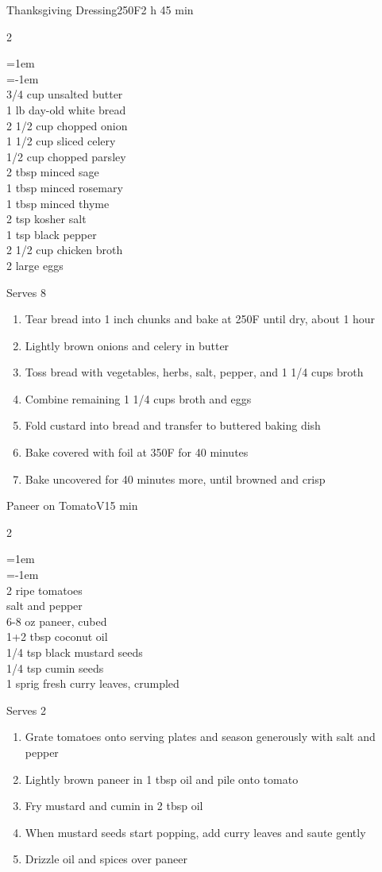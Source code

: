 \documentclass{article}
\newenvironment{recipe}[3][]
    {\begin{cardbase}[#1]{#2}{#3}
    \columnratio{0.333}
    \begin{paracol}{2}}
    {\end{paracol}\end{cardbase}}
\newenvironment{denserecipe}[3][]
    {\small
    \begin{recipe}[#1]{#2}{#3}}
    {\end{recipe}}
\newcommand{\nextcolumn}{\switchcolumn}
\newenvironment{ingredients}
    {
    \begin{obeylines}
    \vspace{\parskip}
    \setlength{\parskip}{0.25em}
    \vspace{-0.25em}
    \leftskip=1em
    \parindent=-1em}
    {\end{obeylines}}
\newenvironment{steps}
    {\begin{enumerate}[leftmargin=*,topsep=0pt]}
    {\end{enumerate}}
\newcommand{\fahrenheit}[1]{#1\textdegree{}F}
\newcommand{\tag}[1]{\hspace{1em}#1}
\newcommand{\symboltag}[2]{\tag{#1\hspace{0.4em}#2}}
\newcommand{\totaltime}[1]{\symboltag{\raisebox{-0.1em}{\small\StopWatchEnd}}{#1}}
\newcommand{\preheat}[1]{\symboltag{\Topbottomheat}{#1}}
\begin{document}
\begin{denserecipe}{Thanksgiving Dressing}{\preheat{\fahrenheit{250}}\totaltime{2 h 45 min}}
\begin{ingredients}
3/4 cup unsalted butter
1 lb day-old white bread
2 1/2 cup chopped onion
1 1/2 cup sliced celery
1/2 cup chopped parsley
2 tbsp minced sage
1 tbsp minced rosemary
1 tbsp minced thyme
2 tsp kosher salt
1 tsp black pepper
2 1/2 cup chicken broth
2 large eggs
\end{ingredients}
\nextcolumn
Serves 8
\begin{steps}
    \item Tear bread into 1 inch chunks and bake at \fahrenheit{250} until dry, about 1 hour
    \item Lightly brown onions and celery in butter
    \item Toss bread with vegetables, herbs, salt, pepper, and 1 1/4 cups broth
    \item Combine remaining 1 1/4 cups broth and eggs
    \item Fold custard into bread and transfer to buttered baking dish
    \item Bake covered with foil at \fahrenheit{350} for 40 minutes
    \item Bake uncovered for 40 minutes more, until browned and crisp
\end{steps}
\end{denserecipe}

\begin{recipe}{Paneer on Tomato}{\tag{V}\totaltime{15 min}}
\begin{ingredients}
2 ripe tomatoes
salt and pepper
6-8 oz paneer, cubed
1+2 tbsp coconut oil
1/4 tsp black mustard seeds
1/4 tsp cumin seeds
1 sprig fresh curry leaves, crumpled
\end{ingredients}
\nextcolumn
Serves 2
\begin{steps}
    \item Grate tomatoes onto serving plates and season generously with salt and pepper
    \item Lightly brown paneer in 1 tbsp oil and pile onto tomato
    \item Fry mustard and cumin in 2 tbsp oil
    \item When mustard seeds start popping, add curry leaves and saute gently
    \item Drizzle oil and spices over paneer
\end{steps}
\end{recipe}
\end{document}
